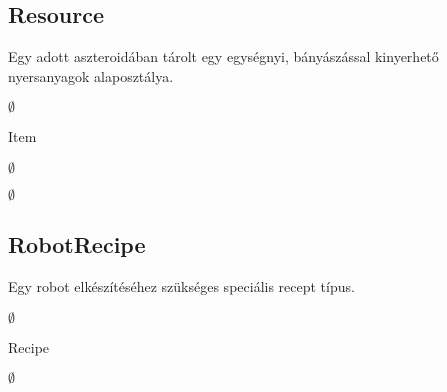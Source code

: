 \documentclass[../../projlab]{subfiles}
\begin{document}
\subsection{Resource}
\begin{class-template-responsibility}
Egy adott aszteroidában tárolt egy egységnyi, bányászással kinyerhető nyersanyagok alaposztálya. 
\end{class-template-responsibility}
\begin{class-template-interface}
$\emptyset$
\end{class-template-interface}
\begin{class-template-baseclass}
Item
\end{class-template-baseclass}
\begin{class-template-attribute}
\item[] $\emptyset$
\end{class-template-attribute}
\begin{class-template-method}
\item[] $\emptyset$
\end{class-template-method}

\subsection{RobotRecipe}
\begin{class-template-responsibility}
Egy robot elkészítéséhez szükséges speciális recept típus. 
\end{class-template-responsibility}
\begin{class-template-interface}
$\emptyset$
\end{class-template-interface}
\begin{class-template-baseclass}
Recipe
\end{class-template-baseclass}
\begin{class-template-attribute}
\item[] $\emptyset$
\end{class-template-attribute}
\begin{class-template-method}
\end{class-template-method}
\end{document}
